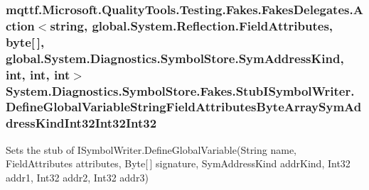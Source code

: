 \hypertarget{class_system_1_1_diagnostics_1_1_symbol_store_1_1_fakes_1_1_stub_i_symbol_writer_a55b59e97ce13dcdde1ecd8e3ab251d62}{
\subsubsection[{Define\-Global\-Variable\-String\-Field\-Attributes\-Byte\-Array\-Sym\-Address\-Kind\-Int32\-Int32\-Int32}]{\setlength{\rightskip}{0pt plus 5cm}mqttf.\-Microsoft.\-Quality\-Tools.\-Testing.\-Fakes.\-Fakes\-Delegates.\-Action$<$string, global.\-System.\-Reflection.\-Field\-Attributes, byte\mbox{[}$\,$\mbox{]}, global.\-System.\-Diagnostics.\-Symbol\-Store.\-Sym\-Address\-Kind, int, int, int$>$ System.\-Diagnostics.\-Symbol\-Store.\-Fakes.\-Stub\-I\-Symbol\-Writer.\-Define\-Global\-Variable\-String\-Field\-Attributes\-Byte\-Array\-Sym\-Address\-Kind\-Int32\-Int32\-Int32}}\label{class_system_1_1_diagnostics_1_1_symbol_store_1_1_fakes_1_1_stub_i_symbol_writer_a55b59e97ce13dcdde1ecd8e3ab251d62}


Sets the stub of I\-Symbol\-Writer.\-Define\-Global\-Variable(\-String name, Field\-Attributes attributes, Byte\mbox{[}$\,$\mbox{]} signature, Sym\-Address\-Kind addr\-Kind, Int32 addr1, Int32 addr2, Int32 addr3)

